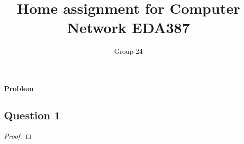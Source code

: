 \documentclass[12pt]{article}
\title{Home assignment for Computer Network EDA387}
\author{Group 24}
\begin{document}
\maketitle

\vspace{0.5in}

\paragraph{Problem}


\subsection*{Question 1}


\bigskip

\begin{proof}



\end{proof}

\vspace{2in} %


\vspace{3in}
\end{document}
